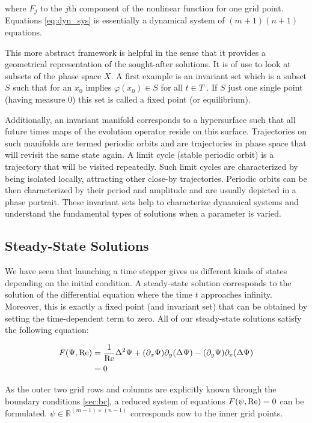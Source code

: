 where $F_j$ to the $j$th component of the nonlinear function for one grid point.
Equations \eqref{eq:dyn_sys} is essentially a dynamical system of $(m+1)(n+1)$
equations.

This more abstract framework is helpful in the sense that it provides a
geometrical representation of the sought-after solutions. It is of use to look
at subsets of the phase space $X$. A first example is an invariant set which is
a subset $S$ such that for an $x_0$ implies $\varphi(x_0) \in S$ for all $t \in
T$ \citep{kuznetsov2004}. If $S$ just one single point (having measure 0) this
set is called a fixed point (or equilibrium). 

Additionally, an invariant manifold corresponds to a hypersurface such that all
future times maps of the evolution operator reside on this surface.
Trajectories on such manifolds are termed periodic orbits and are trajectories
in phase space that will revisit the same state again. A limit cycle (stable
periodic orbit) is a trajectory that will be visited repeatedly. Such limit
cycles are characterized by being isolated locally, attracting other close-by
trajectories. Periodic orbits can be then characterized by their period and
amplitude and are usually depicted in a phase portrait. These invariant sets
help to characterize dynamical systems and understand the fundamental types of
solutions when a parameter is varied.

\subsection{Steady-State Solutions}

We have seen that launching a time stepper gives us different kinds of states
depending on the initial condition. A steady-state solution corresponds to the
solution of the differential equation where the time $t$ approaches infinity.
Moreover, this is exactly a fixed point (and invariant set) that can be
obtained by setting the time-dependent term to zero. All of our steady-state
solutions satisfy the following equation:

\begin{align}
  F(\Psi, \mathrm{Re}) & = \frac{1}{\mathrm{Re}}\Delta^2 \Psi +
    (\partial_x \Psi) \partial_y(\Delta \Psi) -
    (\partial_y \Psi) \partial_x(\Delta \Psi) \nonumber \\
  & =  0 \label{eq:str_steady}
\end{align}

As the outer two grid rows and columns are explicitly known through the
boundary conditions \ref{sec:bc}, a reduced system of equations $F(\psi, \mathrm{Re})
= 0$ can be formulated. $\psi \in \mathbb{R}^{(m-1)\times(n-1)} $ corresponds
now to the inner grid points. 

